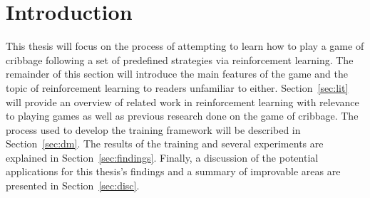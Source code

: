 \section{Introduction}
\label{sec:intro}


This thesis will focus on the process of attempting to learn how to play a game
of cribbage
following a set of predefined strategies
via reinforcement learning.
%
The remainder of this section will introduce the main features
of the game and the topic of reinforcement learning to readers unfamiliar to
either.
%
Section~\ref{sec:lit} will provide an overview of related work in reinforcement
learning with relevance to playing games
as well as previous research done on the game of cribbage.
%
The process used to develop the training framework
will be described in Section~\ref{sec:dm}.
%
The results of the training and several experiments
are explained in Section~\ref{sec:findings}.
%
Finally,
a discussion of the potential applications for this thesis's findings and
a summary of improvable areas are presented in Section~\ref{sec:disc}.






